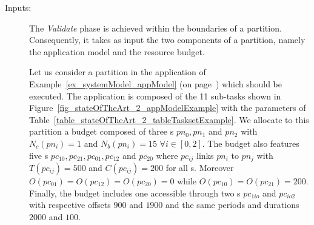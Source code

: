 \documentclass[main.tex]{subfiles}
\begin{document}
\begin{description}
    \item[Inputs: ]
        The \emph{Validate} phase is achieved within the boundaries of a
        partition. Consequently, it takes as input the two components of a
        partition, namely the application model and the resource budget.
        \begin{example}
            \label{ex_framework_exInputsValidation}
            Let us consider a partition in the application of
            Example~\ref{ex_systemModel_appModel} (on
            page~\pageref{ex_systemModel_appModel}) which should be executed.
            The application is composed of the 11 sub-tasks shown in
            Figure~\ref{fig_stateOfTheArt_2_appModelExample} with the
            parameters of
            Table~\ref{table_stateOfTheArt_2_tableTasksetExample}.  We allocate
            to this partition a budget composed of three \PN{}s $pn_0, pn_1 $
            and $pn_2$ with $N_c(pn_i) = 1$ and $N_b(pn_i)=15$ $\forall i \in
            [0,2]$. The budget also features five \PC{}s $pc_{10}, pc_{21},
            pc_{01}, pc_{12}$ and $pc_{20}$ where $pc_{ij}$ links $pn_i$ to
            $pn_j$ with $T(pc_{ij}) = 500$ and $C(pc_{ij}) = 200$ for all
            \PC{}s. Moreover $O(pc_{01}) = O(pc_{12}) = O(pc_{20}) = 0$ while
            $O(pc_{10}) = O(pc_{21}) = 200$. Finally, the budget includes one
            \ION{} accessible through two \PC{}s $pc_{1io}$ and $pc_{io2}$ with
            respective offsets $900$ and $1900$ and the same periods and
            durations $2000$ and $100$. 
        \end{example}


\end{description}
\end{document}
